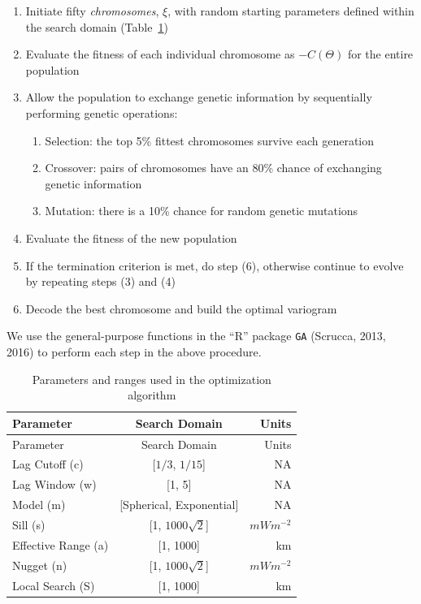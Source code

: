 \documentclass[draft,linenumbers]{agujournal2018}
\begin{document}
\begin{enumerate}
\def\labelenumi{\arabic{enumi}.}
\item
  Initiate fifty \emph{chromosomes}, \(\xi\), with random starting
  parameters defined within the search domain (Table~\ref{tbl:search})
\item
  Evaluate the fitness of each individual chromosome as \(-C(\Theta)\)
  for the entire population
\item
  Allow the population to exchange genetic information by sequentially
  performing genetic operations:

  \begin{enumerate}
  \def\labelenumii{\alph{enumii}.}
  \item
    Selection: the top 5\% fittest chromosomes survive each generation
  \item
    Crossover: pairs of chromosomes have an 80\% chance of exchanging
    genetic information
  \item
    Mutation: there is a 10\% chance for random genetic mutations
  \end{enumerate}
\item
  Evaluate the fitness of the new population
\item
  If the termination criterion is met, do step (6), otherwise continue
  to evolve by repeating steps (3) and (4)
\item
  Decode the best chromosome and build the optimal variogram
\end{enumerate}

We use the general-purpose functions in the ``R'' package \texttt{GA}
(Scrucca, 2013, 2016) to perform each step in the above procedure.

\hypertarget{tbl:search}{}
\begin{longtable}[]{@{}lcr@{}}
\caption{\label{tbl:search}Parameters and ranges used in the
optimization algorithm}\tabularnewline
\toprule
Parameter & Search Domain & Units \\
\midrule
\endfirsthead
\toprule
Parameter & Search Domain & Units \\
\midrule
\endhead
Lag Cutoff (c) & {[}\(1/3\), \(1/15\){]} & NA \\
Lag Window (w) & {[}1, 5{]} & NA \\
Model (m) & {[}Spherical, Exponential{]} & NA \\
Sill (s) & {[}1, \(1000\sqrt{2}\){]} & \(mWm^{-2}\) \\
Effective Range (a) & {[}1, 1000{]} & km \\
Nugget (n) & {[}1, \(1000\sqrt{2}\){]} & \(mWm^{-2}\) \\
Local Search (S) & {[}1, 1000{]} & km \\
\bottomrule
\end{longtable}
\end{document}

